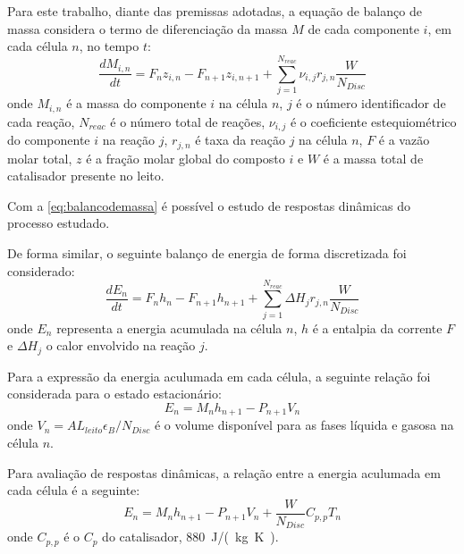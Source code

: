 Para este trabalho, diante das premissas adotadas, a equação de balanço de massa
considera o termo de diferenciação da massa $M$ de cada componente $i$, em cada
célula $n$, no tempo $t$: 
\begin{equation}
\dfrac{dM_{i,n}}{dt} = F_n z_{i,n} - F_{n+1} z_{i,n+1} +
\displaystyle\sum_{j=1}^{N_{reac}} \nu_{i,j}r_{j,n} \dfrac{W}{N_{Disc}}
\label{eq:balancodemassa}
\end{equation}
onde $M_{i,n}$ é a massa do componente $i$ na célula $n$, $j$ é o número
identificador de cada reação, $N_{reac}$ é o número total de reações,
$\nu_{i,j}$ é o coeficiente estequiométrico do componente $i$ na reação $j$,
$r_{j,n}$ é taxa da reação $j$ na célula $n$, $F$ é a vazão molar total,
$z$ é a fração molar global do composto $i$ e $W$ é a massa total de
catalisador presente no leito.

Com a \autoref{eq:balancodemassa} é possível o estudo de respostas dinâmicas do
processo estudado.


De forma similar, o seguinte balanço de energia de forma
discretizada foi considerado:
\begin{equation}
\dfrac{dE_{n}}{dt} = F_nh_{n} - F_{n+1}h_{n+1} +
\displaystyle\sum_{j=1}^{N_{reac}} \Delta H_{j}r_{j,n} \dfrac{W}{N_{Disc}}
\label{eq:balancodeenergia}
\end{equation}
onde $E_{n}$ representa a energia acumulada na célula $n$, $h$ é a entalpia da
corrente $F$ e $\Delta H_{j}$ o calor envolvido na reação $j$.

Para a expressão da energia aculumada em cada célula, a seguinte relação
foi considerada para o estado estacionário:
\begin{equation}
E_{n} = M_{n}h_{n+1} - P_{n+1}V_{n}
\label{eq:holdupenergia}
\end{equation}
onde $V_{n} = AL_{leito}\epsilon_{B}/N_{Disc}$ é o volume disponível para as
fases líquida e gasosa na célula $n$.

Para avaliação de respostas dinâmicas, a relação entre a energia aculumada em
cada célula é a seguinte:
\begin{equation}
E_{n} = M_{n}h_{n+1} - P_{n+1}V_{n} + 
\dfrac{W}{N_{Disc}}C_{p,p}T_{n}
\label{eq:holdupenergiadinamica}
\end{equation}
onde $C_{p,p}$ é o $C_p$ do catalisador, \SI{880}{J/(kg K)}.

